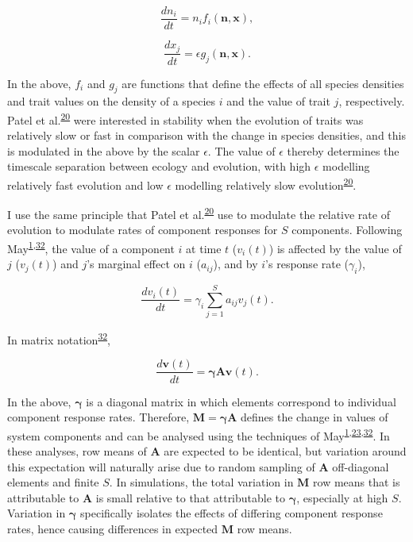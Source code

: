 \documentclass[]{article}
\begin{document}
\[\frac{dn_{i}}{dt} = n_{i}f_{i}(\mathbf{n}, \mathbf{x}),\]

\[\frac{dx_{j}}{dt} = \epsilon g_{j}(\mathbf{n}, \mathbf{x}).\]

In the above, \(f_{i}\) and \(g_{j}\) are functions that define the
effects of all species densities and trait values on the density of a
species \(i\) and the value of trait \(j\), respectively. 
Patel et al.\textsuperscript{\protect\hyperlink{ref-Patel2018}{20}}
were interested in stability when the evolution of traits was relatively
slow or fast in comparison with the change in species
densities, and
this is modulated in the above by the scalar \(\epsilon\). The value of
\(\epsilon\) thereby determines the timescale separation between ecology
and evolution, with high \(\epsilon\) modelling relatively fast
evolution and low \(\epsilon\) modelling relatively slow
evolution\textsuperscript{\protect\hyperlink{ref-Patel2018}{20}}.

I use the same principle that Patel et al.\textsuperscript{\protect\hyperlink{ref-Patel2018}{20}} 
use to modulate the relative
rate of evolution to modulate rates of component responses for \(S\)
components. Following
May\textsuperscript{\protect\hyperlink{ref-May1972}{1},\protect\hyperlink{ref-May1973}{32}},
the value of a component \(i\) at time \(t\) (\(v_{i}(t)\)) is affected
by the value of \(j\) (\(v_{j}(t)\)) and \(j\)'s marginal effect on
\(i\) (\(a_{ij}\)), and by \(i\)'s response rate (\(\gamma_{i}\)),

\[\frac{dv_{i}(t)}{dt} = \gamma_{i} \sum_{j=1}^{S}a_{ij}v_{j}(t).\]

In matrix notation\textsuperscript{\protect\hyperlink{ref-May1973}{32}},

\[\frac{d\mathbf{v}(t)}{dt} = \boldsymbol{\gamma} \mathbf{A}\mathbf{v}(t).\]

In the above, \(\boldsymbol{\gamma}\) is a diagonal matrix in which
elements correspond to individual component response rates. Therefore,
\(\mathbf{M} = \boldsymbol{\gamma} \mathbf{A}\) defines the change in
values of system components and can be analysed using the techniques of
May\textsuperscript{\protect\hyperlink{ref-May1972}{1},\protect\hyperlink{ref-Ahmadian2015}{23},\protect\hyperlink{ref-May1973}{32}}.
In these analyses, row means of \(\mathbf{A}\) are expected to be
identical, but variation around this expectation will naturally arise
due to random sampling of \(\mathbf{A}\) off-diagonal elements and
finite \(S\). In simulations, the total variation in \(\mathbf{M}\) row
means that is attributable to \(\mathbf{A}\) is small relative to that
attributable to \(\boldsymbol{\gamma}\), especially at high \(S\).
Variation in \(\boldsymbol{\gamma}\) specifically isolates the effects
of differing component response rates, hence causing differences in
expected \(\mathbf{M}\) row means.
\end{document}
